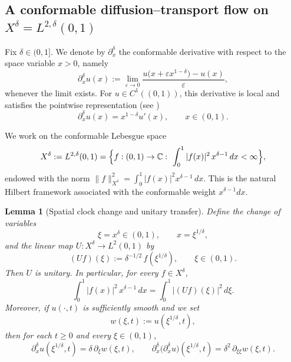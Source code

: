 \documentclass[preprint,12pt]{elsarticle}
\newtheorem{lemma}{Lemma}
\begin{document}
\subsection{A conformable diffusion--transport flow on $X^\delta=L^{2,\delta}(0,1)$}\label{subsec:app1}

Fix $\delta\in(0,1]$.
We denote by $\partial_x^\delta$ the conformable derivative with respect to the
space variable $x>0$, namely
\[
\partial_x^\delta u(x):=\lim_{\varepsilon\to 0}\frac{u\bigl(x+\varepsilon x^{1-\delta}\bigr)-u(x)}{\varepsilon},
\]
whenever the limit exists.
For $u\in C^1((0,1))$, this derivative is local and satisfies the pointwise
representation (see \cite{khalil2014,abdeljawad2015,abdeljawad2016})
\begin{equation}\label{eq:conf_repr_final}
\partial_x^\delta u(x)=x^{1-\delta}u'(x),\qquad x\in(0,1).
\end{equation}

We work on the conformable Lebesgue space
\[
X^\delta:=L^{2,\delta}(0,1)
=\Bigl\{f:(0,1)\to\mathbb C:\ \int_0^1 |f(x)|^2\,x^{\delta-1}\,dx<\infty\Bigr\},
\]
endowed with the norm
\(
\|f\|_{X^\delta}^2=\int_0^1 |f(x)|^2 x^{\delta-1}\,dx.
\)
This is the natural Hilbert framework associated with the conformable weight
$x^{\delta-1}dx$.

\begin{lemma}[Spatial clock change and unitary transfer]\label{lem:spatial_unitary}
Define the change of variables
\[
\xi=x^\delta\in(0,1),\qquad x=\xi^{1/\delta},
\]
and the linear map $U:X^\delta\to L^2(0,1)$ by
\[
(Uf)(\xi):=\delta^{-1/2}\,f(\xi^{1/\delta}),\qquad \xi\in(0,1).
\]
Then $U$ is unitary. In particular, for every $f\in X^\delta$,
\begin{equation}\label{eq:measure_change_final}
\int_0^1 |f(x)|^2\,x^{\delta-1}\,dx
=
\int_0^1 |(Uf)(\xi)|^2\,d\xi.
\end{equation}
Moreover, if $u(\cdot,t)$ is sufficiently smooth and we set
\[
w(\xi,t):=u(\xi^{1/\delta},t),
\]
then for each $t\ge 0$ and every $\xi\in(0,1)$,
\begin{equation}\label{eq:conf_to_classical_final}
\partial_x^\delta u(\xi^{1/\delta},t)=\delta\,\partial_\xi w(\xi,t),
\qquad
\partial_x^\delta\!\bigl(\partial_x^\delta u\bigr)(\xi^{1/\delta},t)=\delta^2\,\partial_{\xi\xi} w(\xi,t).
\end{equation}
\end{lemma}
\end{document}
